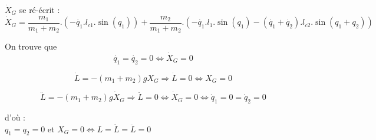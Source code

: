 \documentclass[a4paper,12pt]{report}
\begin{document}
$\dot{X}_G$ se ré-écrit :
$$\dot{X}_G = \frac{m_1}{m_1 + m_2}.(- \dot{q_1}.l_{c1}.\sin(q_1)) + \frac{m_2}{m_1 + m_2}.(- \dot{q_1}.l_{1}.\sin(q_1) - (\dot{q_1} + \dot{q_2}).l_{c2}.\sin(q_1 + q_2))$$

On trouve que
$$\dot{q_1} = \dot{q_2} = 0 \Leftrightarrow \dot{X}_G = 0$$

$$
\dot{L} = - (m_1 + m_2)g X_G \Rightarrow \dot{L} = 0 \Leftrightarrow X_G = 0
$$

$$
\ddot{L} = - (m_1 + m_2)g \dot{X}_G \Rightarrow \ddot{L} = 0 \Leftrightarrow \dot{X}_G = 0 \Leftrightarrow \dot{q}_1 = 0 =\dot{q}_2 = 0
$$


d'où : \\
$q_1 = q_2 = 0$ et $X_G = 0 \Leftrightarrow L = \dot{L} = \ddot{L} = 0$
\end{document}
